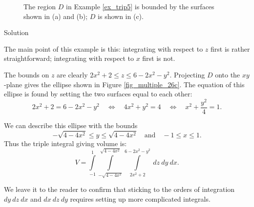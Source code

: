 \begin{example}
\begin{figure}[H]
\centerline{
\qquad
{}}
\caption{The region $D$ in Example \ref{ex_trip5} is bounded by the surfaces shown in (a) and (b); $D$ is shown in (c).%
}
\end{figure}

Solution 

The main point of this example is this: integrating with respect to $z$ first is rather straightforward; integrating with respect to $x$ first is not.

The bounds on $z$ are clearly $2x^2+2\leq z\leq 6-2x^2-y^2$. Projecting $D$ onto the $xy$-plane gives the ellipse shown in Figure \ref{fig_multiple_26c}. The equation of this ellipse is found by setting the two surfaces equal to each other: 
$$2x^2+2 = 6-2x^2-y^2\quad \Leftrightarrow\quad 4x^2+y^2=4\quad \Leftrightarrow\quad x^2+\frac{y^2}4=1.$$


We can describe this ellipse with the bounds 
$$-\sqrt{4-4x^2} \leq y\leq \sqrt{4-4x^2}\quad \text{and}\quad -1\leq x\leq 1.$$ 
Thus the triple integral giving volume is:
$$V= \int\limits_{-1}^1\int\limits_{-\sqrt{4-4x^2}}^{\sqrt{4-4x^2}}\int\limits_{2x^2+2}^{6-2x^2-y^2}\ dz\ dy\ dx .$$

We leave it to the reader to confirm that sticking to the orders of integration $dy\ dz\ dx$ and $dx\ dz\ dy$ requires setting up more complicated integrals. 


\end{example}
